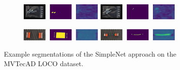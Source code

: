 \begin{figure}[H]
\begin{subfigure}[b]{\textwidth}
    \end{subfigure}
    \begin{subfigure}[b]{\textwidth}
        \centering
        \includegraphics[width=0.45\textwidth]{figures/appendix/appendix_simplenet/SB/image_prediction_150.png}
        \includegraphics[width=0.45\textwidth]{figures/appendix/appendix_simplenet/SB/image_prediction_311.png}

    \end{subfigure}
    \begin{subfigure}[b]{\textwidth}
        \centering
        \includegraphics[width=0.45\textwidth]{figures/appendix/appendix_simplenet/SC/image_prediction_140.png}
        \includegraphics[width=0.45\textwidth]{figures/appendix/appendix_simplenet/SC/image_prediction_298.png}

    \end{subfigure}
    
    \caption{Example segmentations of the SimpleNet \cite{liu2023simplenet} approach on the MVTecAD LOCO \cite{LOCODentsAndScratchesBergmann2022} dataset.}
    \label{fig:appendixpatchcore}
\end{figure}